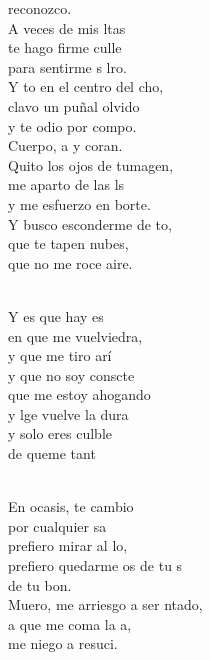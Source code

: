 \begin{cancion}[Culpable][Ixcís]%
	reconozco. \\
	A veces de mis ltas \\
	te hago firme culle \\
	para sentirme s lro. \\
	Y to en el centro del cho,\\
	clavo un puñal olvido \\
	y te odio por compo. \\
	Cuerpo, a y coran. \\
	Quito los ojos de tumagen, \\
	me aparto de las ls \\
	y me esfuerzo en borte. \\
	Y busco esconderme de to,  \\
	que te tapen  nubes,  \\
	que no me roce aire. \\\jump\\
	\begin{chorus}%
	Y es que hay es \\
	en que me vuelviedra, \\
	y que me tiro arí\\
	y que no soy conscte \\
que me estoy ahogando \\
	y lge vuelve la dura \\
	y solo eres culble \\
	de queme tant\\
	\end{chorus}%
	\jump\\
	En ocasis, te cambio\\
	por cualquier sa\\
	prefiero mirar al lo, \\
	prefiero quedarme os de tu s \\
	de tu bon. \\
	Muero, me arriesgo a ser ntado, \\
	a que me coma la a, \\
	me niego a resuci.  \\
\end{cancion}%
